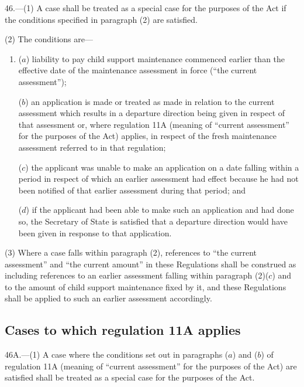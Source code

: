 \documentclass[12pt,a4paper]{article}
\begin{document}
46.—(1) A case shall be treated as a special case for
the purposes of the Act if the conditions specified in paragraph (2) are
satisfied.

(2) The conditions are—
\begin{enumerate}\item[]
($a$) liability to pay child support maintenance commenced earlier than the
effective date of the maintenance assessment in force (“the current
assessment”);

($b$) an application is made or treated as made in relation to the current assessment which results in a departure direction being given in respect of that assessment
or, where regulation 11A (meaning of “current assessment” for the purposes of the Act) applies, in respect of the fresh maintenance assessment referred to in that regulation;  %

($c$) the applicant was unable to make an application on a date falling within a
period in respect of which an earlier assessment had effect because he had not
been notified of that earlier assessment during that period; and

($d$) if the applicant had been able to make such an application and had done so,
the Secretary of State is satisfied that a departure direction would have been
given in response to that application.
\end{enumerate}

(3) Where a case falls within paragraph (2), references to “the current
assessment” and “the current amount” in these Regulations shall be construed as
including references to an earlier assessment falling within paragraph (2)($c$)
and to the amount of child support maintenance fixed by it, and these
Regulations shall be applied to such an earlier assessment accordingly.


\subsection[46A. Cases to which regulation 11A applies]{Cases to which regulation 11A applies}

46A.—(1) A case where the conditions set out in paragraphs ($a$) 
and ($b$)  %
of regulation 11A (meaning of “current assessment” for the purposes of the Act) are satisfied shall be treated as a special case for the purposes of the Act.
\end{document}
